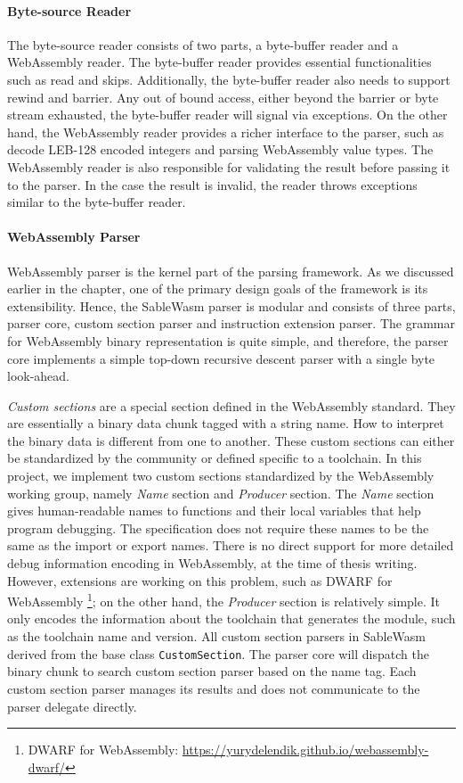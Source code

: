 \paragraph{Byte-source Reader}
The byte-source reader consists of two parts, a byte-buffer reader and a WebAssembly reader. The byte-buffer reader provides essential functionalities such as read and skips. Additionally, the byte-buffer reader also needs to support rewind and barrier. Any out of bound access, either beyond the barrier or byte stream exhausted, the byte-buffer reader will signal via exceptions. On the other hand, the WebAssembly reader provides a richer interface to the parser, such as decode LEB-128 encoded integers and parsing WebAssembly value types. The WebAssembly reader is also responsible for validating the result before passing it to the parser. In the case the result is invalid, the reader throws exceptions similar to the byte-buffer reader.

\paragraph{WebAssembly Parser}
WebAssembly parser is the kernel part of the parsing framework. As we discussed earlier in the chapter, one of the primary design goals of the framework is its extensibility. Hence, the SableWasm parser is modular and consists of three parts, parser core, custom section parser and instruction extension parser. The grammar for WebAssembly binary representation is quite simple, and therefore, the parser core implements a simple top-down recursive descent parser with a single byte look-ahead.

\emph{Custom sections} are a special section defined in the WebAssembly standard. They are essentially a binary data chunk tagged with a string name. How to interpret the binary data is different from one to another. These custom sections can either be standardized by the community or defined specific to a toolchain. In this project, we implement two custom sections standardized by the WebAssembly working group, namely \emph{Name} section and \emph{Producer} section. The \emph{Name} section gives human-readable names to functions and their local variables that help program debugging. The specification does not require these names to be the same as the import or export names. There is no direct support for more detailed debug information encoding in WebAssembly, at the time of thesis writing. However, extensions are working on this problem, such as DWARF for WebAssembly \footnote{DWARF for WebAssembly: \url{https://yurydelendik.github.io/webassembly-dwarf/}}; on the other hand, the \emph{Producer} section is relatively simple. It only encodes the information about the toolchain that generates the module, such as the toolchain name and version. All custom section parsers in SableWasm derived from the base class \texttt{CustomSection}. The parser core will dispatch the binary chunk to search custom section parser based on the name tag. Each custom section parser manages its results and does not communicate to the parser delegate directly. 

